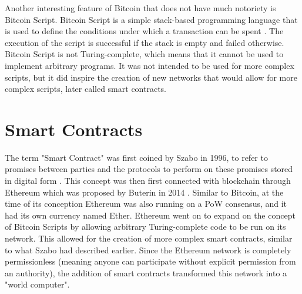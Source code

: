 Another interesting feature of Bitcoin that does not have much notoriety is Bitcoin Script. Bitcoin Script is a simple stack-based programming language that is used to define the conditions under which a transaction can be spent \cite{brakmic_bitcoin_2019}. The execution of the script is successful if the stack is empty and failed otherwise. Bitcoin Script is not Turing-complete, which means that it cannot be used to implement arbitrary programs. It was not intended to be used for more complex scripts, but it did inspire the creation of new networks that would allow for more complex scripts, later called smart contracts.

\section{Smart Contracts}
The term "Smart Contract" was first coined by Szabo in 1996, to refer to promises between parties and the protocols to perform on these promises stored in digital form \cite{szabo_smart_1996}. This concept was then first connected with blockchain through Ethereum which was proposed by Buterin in 2014 \cite{buterin_ethereum_2014}. Similar to Bitcoin, at the time of its conception Ethereum was also running on a \ac{PoW} consensus, and it had its own currency named Ether. Ethereum went on to expand on the concept of Bitcoin Scripts by allowing arbitrary Turing-complete code to be run on its network. This allowed for the creation of more complex smart contracts, similar to what Szabo had described earlier.
Since the Ethereum network is completely permissionless (meaning anyone can participate without explicit permission from an authority), the addition of smart contracts transformed this network into a "world computer".

